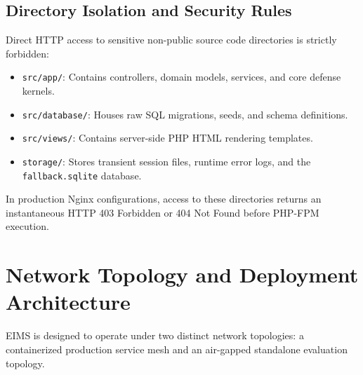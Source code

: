 \subsection{Directory Isolation and Security Rules}
Direct HTTP access to sensitive non-public source code directories is strictly forbidden:
\begin{itemize}
    \item \texttt{src/app/}: Contains controllers, domain models, services, and core defense kernels.
    \item \texttt{src/database/}: Houses raw SQL migrations, seeds, and schema definitions.
    \item \texttt{src/views/}: Contains server-side PHP HTML rendering templates.
    \item \texttt{storage/}: Stores transient session files, runtime error logs, and the \texttt{fallback.sqlite} database.
\end{itemize}
In production Nginx configurations, access to these directories returns an instantaneous HTTP 403 Forbidden or 404 Not Found before PHP-FPM execution.

\section{Network Topology and Deployment Architecture}
\label{sec:req_topology}
EIMS is designed to operate under two distinct network topologies: a containerized production service mesh and an air-gapped standalone evaluation topology.

